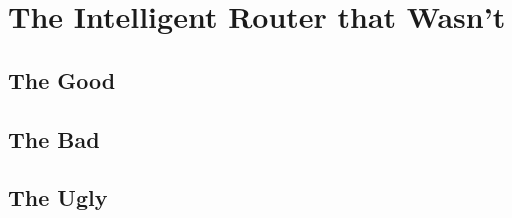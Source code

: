 \chapter{The Intelligent Router that Wasn't}
\label{chapter5}


\section{The Good}


\section{The Bad}


\section{The Ugly}

